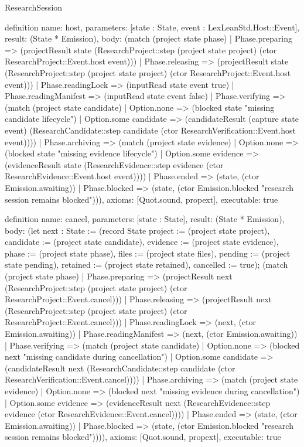 \begin{lexlean}{ResearchSession}
\begin{semanticmodule}
definition{
 name: host,
 parameters: [state : State, event : LexLeanStd.Host::Event],
 result: (State * Emission),
 body: (match (project state phase) | Phase.preparing => (projectResult state (ResearchProject::step (project state project) (ctor ResearchProject::Event.host event))) | Phase.releasing => (projectResult state (ResearchProject::step (project state project) (ctor ResearchProject::Event.host event))) | Phase.readingLock => (inputRead state event true) | Phase.readingManifest => (inputRead state event false) | Phase.verifying => (match (project state candidate) | Option.none => (blocked state "missing candidate lifecycle") | Option.some candidate => (candidateResult (capture state event) (ResearchCandidate::step candidate (ctor ResearchVerification::Event.host event)))) | Phase.archiving => (match (project state evidence) | Option.none => (blocked state "missing evidence lifecycle") | Option.some evidence => (evidenceResult state (ResearchEvidence::step evidence (ctor ResearchEvidence::Event.host event)))) | Phase.ended => (state, (ctor Emission.awaiting)) | Phase.blocked => (state, (ctor Emission.blocked "research session remains blocked"))),
 axioms: [Quot.sound, propext],
 executable: true
}

definition{
 name: cancel,
 parameters: [state : State],
 result: (State * Emission),
 body: (let next : State := (record State {project := (project state project), candidate := (project state candidate), evidence := (project state evidence), phase := (project state phase), files := (project state files), pending := (project state pending), retained := (project state retained), cancelled := true}); (match (project state phase) | Phase.preparing => (projectResult next (ResearchProject::step (project state project) (ctor ResearchProject::Event.cancel))) | Phase.releasing => (projectResult next (ResearchProject::step (project state project) (ctor ResearchProject::Event.cancel))) | Phase.readingLock => (next, (ctor Emission.awaiting)) | Phase.readingManifest => (next, (ctor Emission.awaiting)) | Phase.verifying => (match (project state candidate) | Option.none => (blocked next "missing candidate during cancellation") | Option.some candidate => (candidateResult next (ResearchCandidate::step candidate (ctor ResearchVerification::Event.cancel)))) | Phase.archiving => (match (project state evidence) | Option.none => (blocked next "missing evidence during cancellation") | Option.some evidence => (evidenceResult next (ResearchEvidence::step evidence (ctor ResearchEvidence::Event.cancel)))) | Phase.ended => (state, (ctor Emission.awaiting)) | Phase.blocked => (state, (ctor Emission.blocked "research session remains blocked")))),
 axioms: [Quot.sound, propext],
 executable: true
}


\end{semanticmodule}
\end{lexlean}

